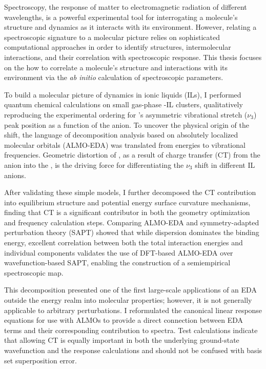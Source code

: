 \documentclass[%
  class = article,%
  crop = false,%
  float = true,%
  multi = true,%
  preview = false,%
]{standalone}
\begin{document}
\onlyifstandalone{\maketitle}
Spectroscopy, the response of matter to electromagnetic radiation of different wavelengths, is a powerful experimental tool for interrogating a molecule's structure and dynamics as it interacts with its environment. However, relating a spectroscopic signature to a molecular picture relies on sophisticated computational approaches in order to identify structures, intermolecular interactions, and their correlation with spectroscopic response. This thesis focuses on the how to correlate a molecule's structure and interactions with its environment via the \textit{ab initio} calculation of spectroscopic parameters.

To build a molecular picture of  dynamics in ionic liquids (ILs), I performed quantum chemical calculations on small gas-phase -IL clusters, qualitatively reproducing the experimental ordering for 's asymmetric vibrational stretch (\(\nu_3\)) peak position as a function of the anion. To uncover the physical origin of the shift, the language of decomposition analysis based on absolutely localized molecular orbitals (ALMO-EDA) was translated from energies to vibrational frequencies. Geometric distortion of , as a result of charge transfer (CT) from the anion into the , is the driving force for differentiating the  \(\nu_3\) shift in different IL anions.

After validating these simple models, I further decomposed the CT contribution into equilibrium structure and potential energy surface curvature mechanisms, finding that CT is a significant contributor in both the geometry optimization and frequency calculation steps. Comparing ALMO-EDA and symmetry-adapted perturbation theory (SAPT) showed that while dispersion dominates the binding energy, excellent correlation between both the total interaction energies and individual components validates the use of DFT-based ALMO-EDA over wavefunction-based SAPT, enabling the construction of a semiempirical spectroscopic map.

This decomposition presented one of the first large-scale applications of an EDA outside the energy realm into molecular properties; however, it is not generally applicable to arbitrary perturbations. I reformulated the canonical linear response equations for use with ALMOs to provide a direct connection between EDA terms and their corresponding contribution to spectra. Test calculations indicate that allowing CT is equally important in both the underlying ground-state wavefunction and the response calculations and should not be confused with basis set superposition error.
\end{document}
